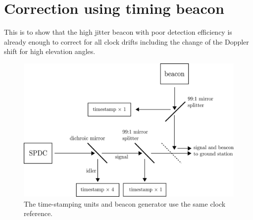 \section{Correction using timing beacon}
This is to show that the high jitter beacon with poor detection efficiency is already enough to correct for all clock drifts including the change of the Doppler shift for high elevation angles.

\begin{figure}[ht!]
	\includegraphics[width=\linewidth]{assets/beacon}
	\caption{The time-stamping units and beacon generator use the same clock reference.}
	\label{fig:beacon}
\end{figure}

